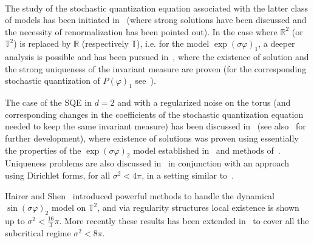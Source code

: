 \documentclass[a4paper,10pt]{article}
\begin{document}
\

The study of the stochastic quantization equation associated with the latter
class of models has been initiated in~{\cite{AHaRu}} (where strong solutions
have been discussed and the necessity of renormalization has been pointed
out). In the case where $\mathbb{R}^2$ (or $\mathbb{T}^2$) is replaced by
$\mathbb{R}$ (respectively $\mathbb{T}$), i.e. for the model $\exp (\sigma
\varphi)_1$, a deeper analysis is possible and has been pursued
in~{\cite{AKaRo}}, where the existence of solution and the strong uniqueness
of the invariant measure are proven (for the corresponding stochastic
quantization of $P (\varphi)_1$ see~{\cite{Iwata1987}}).

The case of the SQE in $d = 2$ and with a regularized noise on the torus (and
corresponding changes in the coefficients of the stochastic quantization
equation needed to keep the same invariant measure) has been discussed
in~{\cite{Mi}} (see also~{\cite{AKaMiRo}} for further development), where
existence of solutions was proven using essentially the properties of the
$\exp (\sigma \varphi)_2$ model established in~{\cite{Krohn1974,FroPa}} and
methods of~{\cite{da_prato_strong_2003}}. Uniqueness problems are also
discussed in~{\cite{AKaMiRo}} in conjunction with an approach using Dirichlet
forms, for all $\sigma^2 < 4 \pi$, in a setting similar to~{\cite{Mi}}.

Hairer and Shen~{\cite{HaiShe}} introduced powerful methods to handle the
dynamical $\sin (\sigma \varphi)_2$ model on $\mathbb{T}^2$, and via
regularity structures local existence is shown up to $\sigma^2 < \frac{16}{3}
\pi$. More recently these results has been extended in~{\cite{ChaHaiShe}} to
cover all the subcritical regime $\sigma^2 < 8 \pi$.

\
\end{document}
